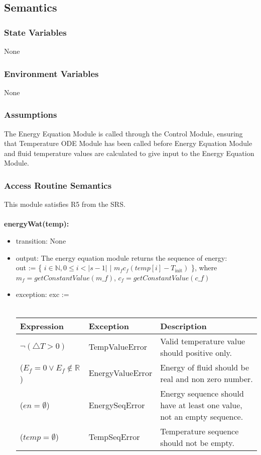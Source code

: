 \documentclass[12pt, titlepage]{article}
\begin{document}
\subsection{Semantics}

\subsubsection{State Variables}

None

\subsubsection{Environment Variables}

None  

\subsubsection{Assumptions}

The Energy Equation Module is called through the Control Module, ensuring that Temperature ODE Module has been called before Energy Equation Module and fluid temperature values are calculated to give input to the Energy Equation Module.

\subsubsection{Access Routine Semantics}
This module satisfies R5 from the SRS. \\ \\
\noindent \textbf{energyWat(temp):}
\begin{itemize}
\item transition: None
\item output: The energy equation module returns the sequence of energy: \\ out := \{ $i \in \mathbb{N}, 0 \le i < |s-1|$ $ | $ $m_f c_f (temp[i] - T_\text{init})$   \}, where $m_f = getConstantValue(m\_f) $, $c_f = getConstantValue(c\_f)$

\item exception: exc := \\ \\
 \begin{tabular}{p{5cm} p{3.5cm} p{5.5cm}}
 \hline
 \textbf{Expression} & \textbf{Exception} & \textbf{Description} \\
  \hline
  $\neg ( \triangle T > 0 ) $ & TempValueError & Valid temperature value should positive only. \\ 
  \hline
    ($E_f = 0 \vee E_f \notin \mathbb{R}$) & EnergyValueError & Energy of fluid should be real and non zero number.   \\
    \hline 
        ($en = \emptyset $) & EnergySeqError & Energy sequence should have at least one value, not an empty sequence. \\ 
    \hline
    ($temp = \emptyset $) & TempSeqError & Temperature sequence should not be empty. \\ 
    \hline
 \end{tabular}
 
\end{itemize}
\end{document}
